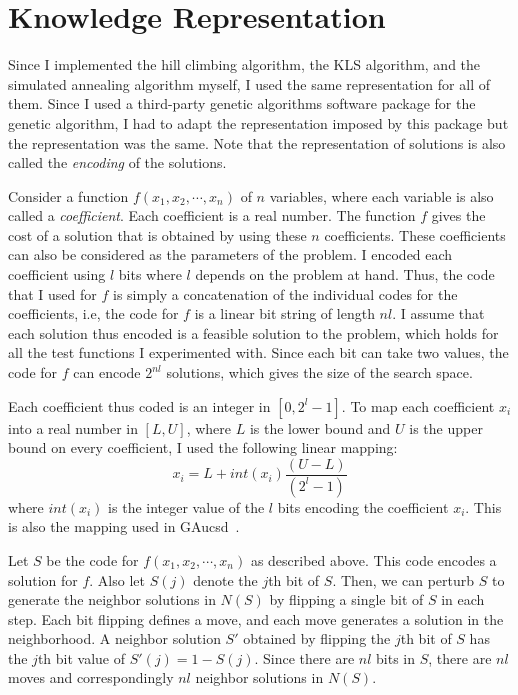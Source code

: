 \documentclass{article}
\begin{document}
\section{Knowledge Representation}
\label{sec:know-rep}

Since I implemented the hill climbing algorithm, the KLS algorithm,
and the simulated annealing algorithm myself, I used the same
representation for all of them. Since I used a third-party genetic
algorithms software package for the genetic algorithm, I had to adapt
the representation imposed by this package but the representation was
the same. Note that the representation of solutions is also called the
{\em encoding} of the solutions.

Consider a function $f(x_1, x_2, \cdots, x_n)$ of $n$ variables, where
each variable is also called a {\em coefficient}. Each coefficient is
a real number. The function $f$ gives the cost of a solution that is
obtained by using these $n$ coefficients. These coefficients can also
be considered as the parameters of the problem. I encoded each
coefficient using $l$ bits where $l$ depends on the problem at
hand. Thus, the code that I used for $f$ is simply a concatenation of
the individual codes for the coefficients, i.e, the code for $f$ is a
linear bit string of length $nl$. I assume that each solution thus
encoded is a feasible solution to the problem, which holds for all the
test functions I experimented with. Since each bit can take two
values, the code for $f$ can encode $2^{nl}$ solutions, which gives
the size of the search space.

Each coefficient thus coded is an integer in $[0,2^{l}-1]$. To map each
  coefficient $x_{i}$ into a real number in $[L, U]$, where $L$ is the
  lower bound and $U$ is the upper bound on every coefficient, I used
  the following linear mapping:
\begin{equation}
x_{i} = L + int(x_{i})\frac{(U-L)}{(2^{l}-1)}
\end{equation}
where $int(x_{i})$ is the integer value of the $l$ bits encoding the
coefficient $x_{i}$. This is also the mapping used in
GAucsd~\cite{ScGr92}.

Let $S$ be the code for $f(x_1, x_2, \cdots, x_n)$ as described
above. This code encodes a solution for $f$. Also let $S(j)$ denote
the $j$th bit of $S$. Then, we can perturb $S$ to generate the
neighbor solutions in $N(S)$ by flipping a single bit of $S$ in each
step. Each bit flipping defines a move, and each move generates a
solution in the neighborhood. A neighbor solution $S'$ obtained by
flipping the $j$th bit of $S$ has the $j$th bit value of $S'(j) =
1-S(j)$. Since there are $nl$ bits in $S$, there are $nl$ moves and
correspondingly $nl$ neighbor solutions in $N(S)$.
\end{document}
